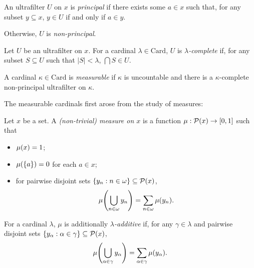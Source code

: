 \documentclass[12pt]{article}
\theoremstyle{plain}
\theoremstyle{definition}
\newcommand{\Card}{\mathrm{Card}}
\begin{document}
\begin{definition}
	An ultrafilter $U$ on $x$ is \emph{principal} if there exists some $a \in x$ such that, for any subset $y \subseteq x$, $y \in U$ if and only if $a \in y$.

	Otherwise, $U$ is \emph{non-principal}.
\end{definition}

\begin{definition}
	Let $U$ be an ultrafilter on $x$. For a cardinal $\lambda \in \Card$, $U$ is \emph{$\lambda$-complete} if, for any subset $S \subseteq U$ such that $\left|S\right| < \lambda$, $\bigcap S \in U$.
\end{definition}

\begin{definition}
	A cardinal $\kappa \in \Card$ is \emph{measurable} if $\kappa$ is uncountable and there is a $\kappa$-complete non-principal ultrafilter on $\kappa$.
\end{definition}

The measurable cardinals first arose from the study of measures:

\begin{definition}[Measures]
	Let $x$ be a set. A \emph{(non-trivial) measure on $x$} is a function $\mu : \mathcal{P}\mleft(x\mright) \rightarrow \left[0, 1\right]$ such that
	\begin{itemize}
		\item $\mu\mleft(x\mright) = 1$;
		\item $\mu\mleft(\left\{a\right\}\mright) = 0$ for each $a \in x$;
		\item for pairwise disjoint sets $\left\{y_n : n \in \omega\right\} \subseteq \mathcal{P}\mleft(x\mright)$,
		      \[\mu\mleft(\bigcup_{n \in \omega} y_n\mright) = \sum_{n \in \omega} \mu\mleft(y_n\mright).\]
	\end{itemize}

	For a cardinal $\lambda$, $\mu$ is additionally \emph{$\lambda$-additive} if, for any $\gamma \in \lambda$ and pairwise disjoint sets $\left\{y_\alpha : \alpha \in \gamma\right\} \subseteq \mathcal{P}\mleft(x\mright)$,
	\[\mu\mleft(\bigcup_{\alpha \in \gamma} y_\alpha\mright) = \sum_{\alpha \in \gamma} \mu\mleft(y_\alpha\mright).\]
\end{definition}
\end{document}
